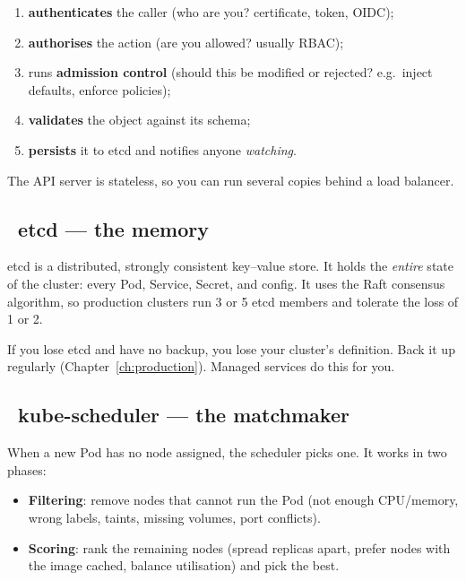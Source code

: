 \begin{enumerate}
  \item \textbf{authenticates} the caller (who are you? certificate, token, OIDC);
  \item \textbf{authorises} the action (are you allowed? usually RBAC);
  \item runs \textbf{admission control} (should this be modified or rejected?
        e.g.\ inject defaults, enforce policies);
  \item \textbf{validates} the object against its schema;
  \item \textbf{persists} it to etcd and notifies anyone \emph{watching}.
\end{enumerate}

The API server is stateless, so you can run several copies behind a load balancer.

\subsection{\ etcd --- the memory}

etcd is a distributed, strongly consistent key--value store. It holds the
\emph{entire} state of the cluster: every Pod, Service, Secret, and config. It
uses the Raft consensus algorithm, so production clusters run 3 or 5 etcd
members and tolerate the loss of 1 or 2.

\begin{warningbox}
If you lose etcd and have no backup, you lose your cluster's definition.
Back it up regularly (Chapter~\ref{ch:production}). Managed services do this for you.
\end{warningbox}

\subsection{\ kube-scheduler --- the matchmaker}

When a new Pod has no node assigned, the scheduler picks one. It works in two phases:

\begin{itemize}
  \item \textbf{Filtering}: remove nodes that cannot run the Pod (not enough
        CPU/memory, wrong labels, taints, missing volumes, port conflicts).
  \item \textbf{Scoring}: rank the remaining nodes (spread replicas apart,
        prefer nodes with the image cached, balance utilisation) and pick the best.
\end{itemize}

